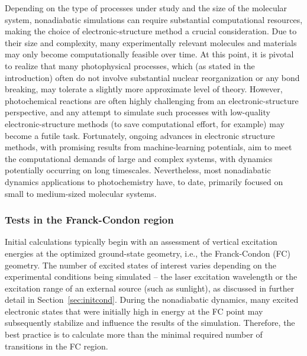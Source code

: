 \documentclass[9pt,bestpractices,pubversion]{livecoms}
\begin{document}
Depending on the type of processes under study and the size of the molecular system, nonadiabatic simulations can require substantial computational resources, making the choice of electronic-structure method a crucial consideration. Due to their size and complexity, many experimentally relevant molecules and materials may only become computationally feasible over time. At this point, it is pivotal to realize that many photophysical processes, which (as stated in the introduction) often do not involve substantial nuclear reorganization or any bond breaking, may tolerate a slightly more approximate level of theory. However, photochemical reactions are often highly challenging from an electronic-structure perspective, and any attempt to simulate such processes with low-quality electronic-structure methods (to save computational effort, for example) may become a futile task. Fortunately, ongoing advances in electronic structure methods, with promising results from machine-learning potentials, aim to meet the computational demands of large and complex systems, with dynamics potentially occurring on long timescales. Nevertheless, most nonadiabatic dynamics applications to photochemistry have, to date, primarily focused on small to medium-sized molecular systems.

\subsubsection{Tests in the Franck-Condon region}\label{sec:fctest}
Initial calculations typically begin with an assessment of vertical excitation energies at the optimized ground-state geometry, i.e., the Franck-Condon (FC) geometry. The number of excited states of interest varies depending on the experimental conditions being simulated -- the laser excitation wavelength or the excitation range of an external source (such as sunlight), as discussed in further detail in Section~\ref{sec:initcond}. During the nonadiabatic dynamics, many excited electronic states that were initially high in energy at the FC point may subsequently stabilize and influence the results of the simulation. Therefore, the best practice is to calculate more than the minimal required number of transitions in the FC region.
\end{document}
